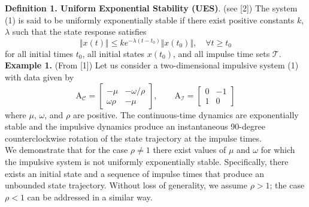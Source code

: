 \documentclass[11pt,a4paper]{article}
\begin{document}
\textbf{Definition 1. Uniform Exponential Stability (UES)}. (see [2])
The system (1) is said to be uniformly exponentially stable if there exist positive constants $k$, $\lambda$ such that the state response satisfies
$$
\Vert x(t) \Vert \leq ke^{-\lambda(t-t_0)}\Vert x(t_0) \Vert, \quad \forall t \geq t_0
$$
for all initial times $t_0$, all initial states $x(t_0)$, and all impulse time sets $\mathcal{T}$.\\

\textbf{Example 1.} (From [1]) Let us consider a two-dimensional impulsive system (1) with data given by 
	$$
	\mathrm{A}_{\mathcal{C}} = 
	\begin{bmatrix}
 		-\mu & -\omega/ \rho \\
 		\omega \rho & -\mu
 	\end{bmatrix},  \qquad
	\mathrm{A}_{\mathcal{I}} = 
	\begin{bmatrix}
 		0 & -1 \\
 		1 & 0
 	\end{bmatrix}
 	$$
where $\mu$, $\omega$, and $\rho$ are positive. 
The continuous-time dynamics are exponentially stable and the impulsive dynamics produce an instantaneous 90-degree counterclockwise rotation of the state trajectory at the impulse times.\\

We demonstrate that for the case $\rho \neq 1$ there exist values of $\mu$ and $\omega$ for which the impulsive
system is not uniformly exponentially stable.  Specifically, there exists an initial state and a sequence of impulse times
that produce an unbounded state trajectory.
Without loss of generality, we assume $\rho > 1$; the case $\rho < 1$ can be addressed in a similar way.
\end{document}
